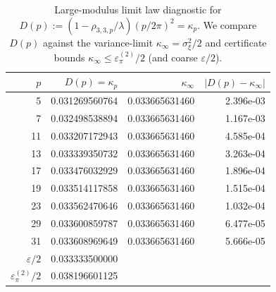 \begin{table}[H]
\centering
\scriptsize
\setlength{\tabcolsep}{6pt}
\caption{Large-modulus limit law diagnostic for $D(p):=(1-\rho_{3,3,p}/\lambda)(p/2\pi)^2=\kappa_p$. We compare $D(p)$ against the variance-limit $\kappa_\infty=\sigma_\xi^2/2$ and certificate bounds $\kappa_\infty\le \varepsilon_\pi^{(2)}/2$ (and coarse $\varepsilon/2$).}
\label{tab:real_input_40_arity_335_n2_limit_law}
\begin{tabular}{r r r r}
\toprule
$p$ & $D(p)=\kappa_p$ & $\kappa_\infty$ & $|D(p)-\kappa_\infty|$\\
\midrule
5 & 0.031269560764 & 0.033665631460 & 2.396e-03\\
7 & 0.032498538894 & 0.033665631460 & 1.167e-03\\
11 & 0.033207172943 & 0.033665631460 & 4.585e-04\\
13 & 0.033339350732 & 0.033665631460 & 3.263e-04\\
17 & 0.033476032929 & 0.033665631460 & 1.896e-04\\
19 & 0.033514117858 & 0.033665631460 & 1.515e-04\\
23 & 0.033562470646 & 0.033665631460 & 1.032e-04\\
29 & 0.033600859787 & 0.033665631460 & 6.477e-05\\
31 & 0.033608969649 & 0.033665631460 & 5.666e-05\\
\midrule
$\varepsilon/2$ & \multicolumn{3}{l}{0.033333500000}\\
$\varepsilon_\pi^{(2)}/2$ & \multicolumn{3}{l}{0.038196601125}\\
\bottomrule
\end{tabular}
\end{table}
